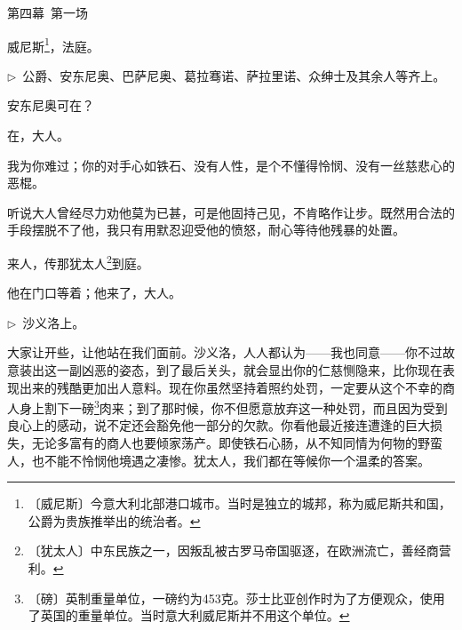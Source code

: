 \documentclass[12pt,UTF-8,openany]{ctexbook}
\begin{document}
\begin{normalsize}
    
    第四幕~第一场
    
    威尼斯\footnote{〔威尼斯〕今意大利北部港口城市。当时是独立的城邦，称为威尼斯共和国，公爵为贵族推举出的统治者。}，法庭。
    
    \noindent $\triangleright$~公爵、安东尼奥、巴萨尼奥、葛拉骞诺、萨拉里诺、众绅士及其余人等齐上。
    
    \begin{description}[itemsep=1ex,leftmargin=4.5em,labelwidth=4em]
    
    \item[{\color{script-1-0} 公爵}]安东尼奥可在？
    
    \item[{\color{script-1-1} 安东尼奥}]在，大人。
    
    \item[{\color{script-1-0} 公爵}]我为你难过；你的对手心如铁石、没有人性，是个不懂得怜悯、没有一丝慈悲心的恶棍。
    
    \item[{\color{script-1-1} 安东尼奥}]听说大人曾经尽力劝他莫为已甚，可是他固持己见，不肯略作让步。既然用合法的手段摆脱不了他，我只有用默忍迎受他的愤怒，耐心等待他残暴的处置。
    
    \item[{\color{script-1-0} 公爵}]来人，传那犹太人\footnote{〔犹太人〕中东民族之一，因叛乱被古罗马帝国驱逐，在欧洲流亡，善经商营利。}到庭。
    
    \item[{\color{script-1-2} 萨拉里诺}]他在门口等着；他来了，大人。
    
    \end{description}
    
    \noindent $\triangleright$~沙义洛上。
    
    \begin{description}[itemsep=1ex,leftmargin=4.5em,labelwidth=4em]
    
    \item[{\color{script-1-0} 公爵}]大家让开些，让他站在我们面前。沙义洛，人人都认为——我也同意——你不过故意装出这一副凶恶的姿态，到了最后关头，就会显出你的仁慈恻隐来，比你现在表现出来的残酷更加出人意料。现在你虽然坚持着照约处罚，一定要从这个不幸的商人身上割下一磅\footnote{〔磅〕英制重量单位，一磅约为453克。莎士比亚创作时为了方便观众，使用了英国的重量单位。当时意大利威尼斯并不用这个单位。}肉来；到了那时候，你不但愿意放弃这一种处罚，而且因为受到良心上的感动，说不定还会豁免他一部分的欠款。你看他最近接连遭逢的巨大损失，无论多富有的商人也要倾家荡产。即使铁石心肠，从不知同情为何物的野蛮人，也不能不怜悯他境遇之凄惨。犹太人，我们都在等候你一个温柔的答案。
    

\end{description}
\end{normalsize}
\end{document}
